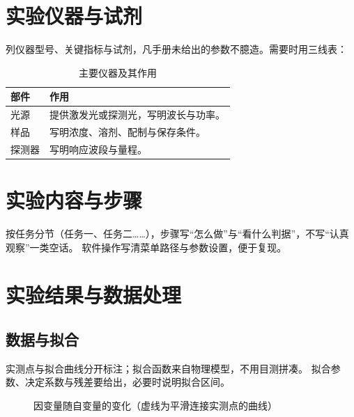 \documentclass[UTF8,zihao=5,a4paper]{ctexart}
\begin{document}
\section{实验仪器与试剂}
列仪器型号、关键指标与试剂，凡手册未给出的参数不臆造。需要时用三线表：
\begin{table}[H]
\centering
\caption{主要仪器及其作用}
\label{tab:devices}
\begin{tabularx}{\linewidth}{>{\raggedright\arraybackslash}p{3.6cm}X}
\toprule
部件 & 作用\\
\midrule
光源 & 提供激发光或探测光，写明波长与功率。\\
样品 & 写明浓度、溶剂、配制与保存条件。\\
探测器 & 写明响应波段与量程。\\
\bottomrule
\end{tabularx}
\end{table}

\section{实验内容与步骤}
按任务分节（任务一、任务二……），步骤写“怎么做”与“看什么判据”，不写“认真观察”一类空话。
软件操作写清菜单路径与参数设置，便于复现。

\section{实验结果与数据处理}
\subsection{数据与拟合}
实测点与拟合曲线分开标注；拟合函数来自物理模型，不用目测拼凑。
拟合参数、决定系数与残差要给出，必要时说明拟合区间。
\begin{figure}[htbp]
\centering
{}
\caption{因变量随自变量的变化（虚线为平滑连接实测点的曲线）}
\label{fig:data}
\end{figure}
\end{document}
